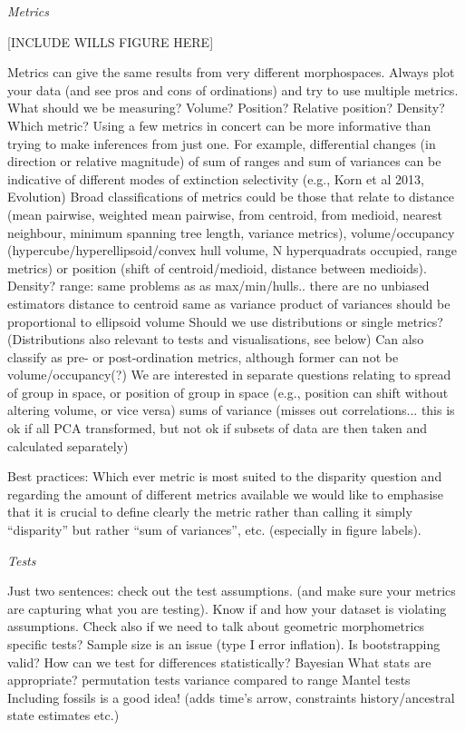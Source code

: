 \documentclass[12pt,letterpaper]{article}
\renewcommand{\subsection}[1]{%
\bigskip
\begin{center}
\begin{large}
\normalfont\itshape #1
\end{large}
\end{center}}
\begin{document}
\subsection{Metrics}
\label{metrics}
 

[INCLUDE WILLS FIGURE HERE]

Metrics can give the same results from very different morphospaces. Always plot your data (and see pros and cons of ordinations) and try to use multiple metrics.
What should we be measuring? Volume? Position? Relative position? Density? Which metric? Using a few metrics in concert can be more informative than trying to make inferences from just one. For example, differential changes (in direction or relative magnitude) of sum of ranges and sum of variances can be indicative of different modes of extinction selectivity (e.g., Korn et al 2013, Evolution)
Broad classifications of metrics could be those that relate to distance (mean pairwise, weighted mean pairwise, from centroid, from medioid, nearest neighbour, minimum spanning tree length, variance metrics), volume/occupancy (hypercube/hyperellipsoid/convex hull volume, N hyperquadrats occupied, range metrics) or position (shift of centroid/medioid, distance between medioids). Density?
range: same problems as as max/min/hulls.. there are no unbiased estimators
distance to centroid same as variance
product of variances should be proportional to ellipsoid volume
Should we use distributions or single metrics? (Distributions also relevant to tests and visualisations, see below)
Can also classify as pre- or post-ordination metrics, although former can not be volume/occupancy(?)
We are interested in separate questions relating to spread of group in space, or position of group in space (e.g., position can shift without altering volume, or vice versa)
sums of variance (misses out correlations... this is ok if all PCA transformed, but not ok if subsets of data are then taken and calculated separately)


Best practices:
Which ever metric is most suited to the disparity question and regarding the amount of different metrics available we would like to emphasise that it is crucial to define clearly the metric rather than calling it simply ``disparity'' but rather ``sum of variances'', etc. (especially in figure labels).

\subsection{Tests}
Just two sentences: check out the test assumptions. (and make sure your metrics are capturing what you are testing). Know if and how your dataset is violating assumptions. Check also if we need to talk about geometric morphometrics specific tests?
Sample size is an issue (type I error inflation).
Is bootstrapping valid?
How can we test for differences statistically?
Bayesian
What stats are appropriate?
permutation tests
variance compared to range
Mantel tests
Including fossils is a good idea! (adds time’s arrow, constraints history/ancestral state estimates etc.)
\end{document}
